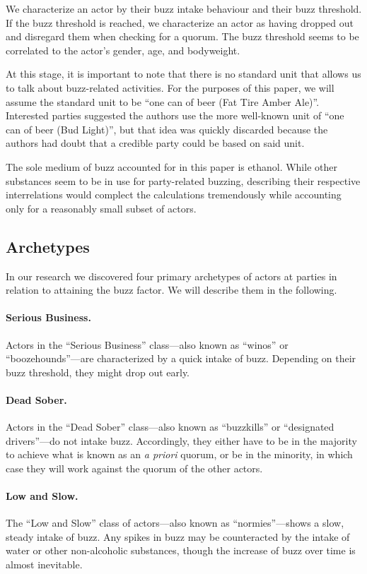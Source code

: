 \documentclass[twocolumn]{article}
\begin{document}
We characterize an actor by their buzz intake behaviour and their buzz
threshold. If the buzz threshold is reached, we characterize an actor as having
dropped out and disregard them when checking for a quorum. The buzz threshold
seems to be correlated to the actor’s gender, age, and bodyweight.

At this stage, it is important to note that there is no standard unit that
allows us to talk about buzz-related activities. For the purposes of this paper,
we will assume the standard unit to be “one can of beer (Fat Tire Amber Ale)”.
Interested parties suggested the authors use the more well-known unit of “one
can of beer (Bud Light)”, but that idea was quickly discarded because the
authors had doubt that a credible party could be based on said unit.

The sole medium of buzz accounted for in this paper is ethanol. While other
substances seem to be in use for party-related buzzing, describing their
respective interrelations would complect the calculations tremendously while
accounting only for a reasonably small subset of actors.

\subsection{Archetypes}

In our research we discovered four primary archetypes of actors at parties in
relation to attaining the buzz factor. We will describe them in the following.

\paragraph{Serious Business.} Actors in the “Serious Business” class—also known
as “winos” or “boozehounds”—are characterized by a quick intake of buzz.
Depending on their buzz threshold, they might drop out early.

\paragraph{Dead Sober.} Actors in the “Dead Sober” class—also known as
“buzzkills” or “designated drivers”—do not intake buzz. Accordingly, they either
have to be in the majority to achieve what is known as an \textit{a priori}
quorum, or be in the minority, in which case they will work against the quorum
of the other actors.

\paragraph{Low and Slow.} The “Low and Slow” class of actors—also known as
“normies”—shows a slow, steady intake of buzz. Any spikes in buzz may be
counteracted by the intake of water or other non-alcoholic substances, though
the increase of buzz over time is almost inevitable.
\end{document}
